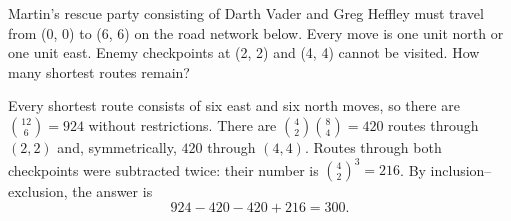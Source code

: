 Martin's rescue party consisting of Darth Vader and Greg Heffley must travel from (0, 0) to (6, 6) on the road network below. Every move is one unit north or one unit east. Enemy checkpoints at (2, 2) and (4, 4) cannot be visited. How many shortest routes remain?

\begin{solution}
Every shortest route consists of six east and six north moves, so there
are $\binom{12}{6}=924$ without restrictions.
There are $\binom42\binom84=420$ routes through $(2,2)$ and,
symmetrically, $420$ through $(4,4)$. Routes through both checkpoints
were subtracted twice: their number is $\binom42^3=216$.
By inclusion--exclusion, the answer is
\[
\boxed{924-420-420+216=300}.
\]
\end{solution}
